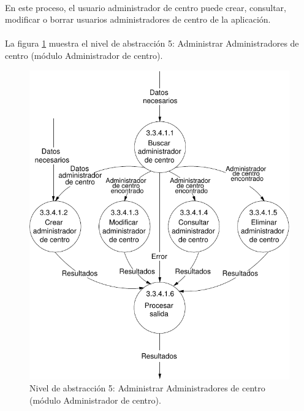 \paragraph{}En este proceso, el usuario administrador de centro puede crear,
consultar, modificar o borrar usuarios administradores de centro de la
aplicación.

\paragraph{}La figura \ref{diagramaNivel5-AdministrarAdministradoresCentro-admCentro}
muestra el nivel de abstracción 5: Administrar Administradores de centro (módulo
Administrador de centro).

  \begin{figure}[!ht]
    \begin{center}
      \includegraphics[]{08.Analisis_Funcional/8.2.DFDs/Niveles/Nivel5/AdministradorCentro/AdministrarUsuarios/AdministrarAdministradoresCentro/Diagramas/nivel5-AdministrarAdministradoresCentro.pdf}
      \caption{Nivel de abstracción 5: Administrar Administradores de centro
      (módulo Administrador de centro).}
      \label{diagramaNivel5-AdministrarAdministradoresCentro-admCentro}
    \end{center}
  \end{figure}
